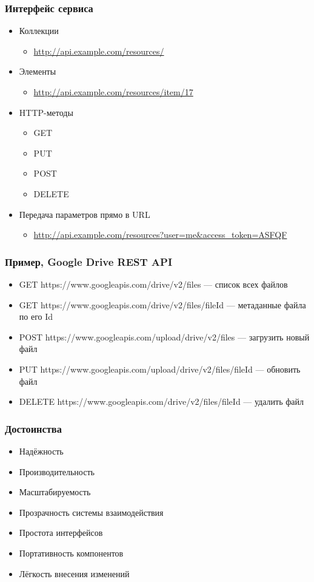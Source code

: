 \documentclass[xetex,mathserif,serif]{beamer}
\begin{document}
	\begin{frame}
		\frametitle{Интерфейс сервиса}
		\begin{itemize}
			\item Коллекции
			\begin{itemize}
				\item \url{http://api.example.com/resources/}
			\end{itemize}
			\item Элементы
			\begin{itemize}
				\item \url{http://api.example.com/resources/item/17}
			\end{itemize}
			\item HTTP-методы
			\begin{itemize}
				\item GET
				\item PUT
				\item POST
				\item DELETE
			\end{itemize}
			\item Передача параметров прямо в URL
			\begin{itemize}
				\item \url{http://api.example.com/resources?user=me&access_token=ASFQF}
			\end{itemize}
		\end{itemize}
	\end{frame}

	\begin{frame}
		\frametitle{Пример, Google Drive REST API}
		\begin{itemize}
			\item GET https://www.googleapis.com/drive/v2/files --- список всех файлов
			\item GET https://www.googleapis.com/drive/v2/files/fileId --- метаданные файла по его Id
			\item POST https://www.googleapis.com/upload/drive/v2/files — загрузить новый файл
			\item PUT https://www.googleapis.com/upload/drive/v2/files/fileId --- обновить файл
			\item DELETE https://www.googleapis.com/drive/v2/files/fileId --- удалить файл
		\end{itemize}
	\end{frame}

	\begin{frame}
		\frametitle{Достоинства}
		\begin{itemize}
			\item Надёжность
			\item Производительность
			\item Масштабируемость
			\item Прозрачность системы взаимодействия
			\item Простота интерфейсов
			\item Портативность компонентов
			\item Лёгкость внесения изменений
		\end{itemize}
	\end{frame}
\end{document}
